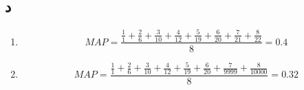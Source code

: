 \documentclass[11pt]{article}
\begin{document}
\subsection{د}
\begin{enumerate}
\item
$$ MAP = \frac{\frac{1}{1} + \frac{2}{6} + \frac{3}{10} + \frac{4}{12} + \frac{5}{19} + \frac{6}{20} + \frac{7}{21} + \frac{8}{22}}{8} = 0.4 $$
\item
$$ MAP = \frac{\frac{1}{1} + \frac{2}{6} + \frac{3}{10} + \frac{4}{12} + \frac{5}{19} + \frac{6}{20} + \frac{7}{9999} + \frac{8}{10000}}{8} = 0.32 $$


\end{enumerate}
\end{document}
